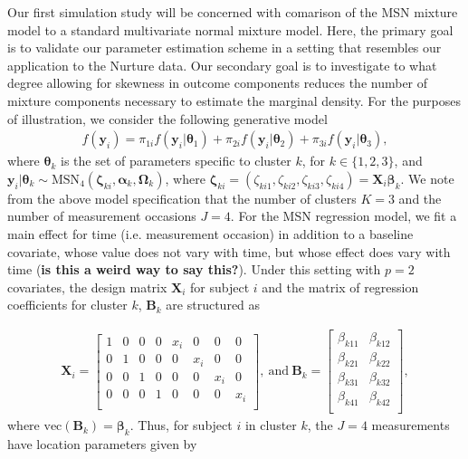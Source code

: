 \documentclass[useAMS,referee]{biom}
\begin{document}
Our first simulation study will be concerned with comarison of the MSN mixture model to a standard multivariate normal mixture model. Here, the primary goal is to validate our parameter estimation scheme in a setting that resembles our application to the Nurture data. Our secondary goal is to investigate to what degree allowing for skewness in outcome components reduces the number of mixture components necessary to estimate the marginal density. For the purposes of illustration, we consider the following generative model 
\begin{eqnarray}
	f(\mathbf{y}_i) = \pi_{1i}f(\mathbf{y}_i|\boldsymbol\theta_1) + \pi_{2i}f(\mathbf{y}_i|\boldsymbol\theta_2) + \pi_{3i}f(\mathbf{y}_i|\boldsymbol\theta_3), \nonumber
\end{eqnarray}
where $\boldsymbol\theta_k$ is the set of parameters specific to cluster $k$, for $k \in \{1,2,3 \}$, and $\mathbf{y}_i | \boldsymbol\theta_k \sim \text{MSN}_4(\boldsymbol\zeta_{ki},\boldsymbol\alpha_k,\boldsymbol\Omega_k)$, where $\boldsymbol\zeta_{ki} = (\zeta_{ki1},\zeta_{ki2},\zeta_{ki3},\zeta_{ki4}) = \mathbf{X}_i \boldsymbol\beta_{k}$. We note from the above model specification that the number of clusters $K = 3$ and the number of measurement occasions $J = 4$. For the MSN regression model, we fit a main effect for time (i.e. measurement occasion) in addition to a baseline covariate, whose value does not vary with time, but whose effect does vary with time (\textbf{is this a weird way to say this?}). Under this setting with $p = 2$ covariates, the design matrix $\mathbf{X}_i$ for subject $i$ and the matrix of regression coefficients for cluster $k$, $\mathbf{B}_k$ are structured as

\begin{eqnarray}
	\mathbf{X}_i = 
	\begin{bmatrix}
		1 & 0 & 0 & 0 & x_i & 0 & 0 & 0\\
		0 & 1 & 0 & 0 & 0 & x_i & 0 & 0\\
		0 & 0 & 1 & 0 & 0 & 0 & x_i & 0\\
		0 & 0 & 0 & 1 & 0 & 0 & 0 & x_i\\
	\end{bmatrix}, \ \text{and} \ 
	\mathbf{B}_k = 
	\begin{bmatrix}
		\beta_{k11} & \beta_{k12} \\
		\beta_{k21} & \beta_{k22} \\
		\beta_{k31} & \beta_{k32} \\
		\beta_{k41} & \beta_{k42} \\
	\end{bmatrix}, \nonumber
\end{eqnarray}
where $\text{vec}({\mathbf{B}_k}) = \boldsymbol\beta_k$. Thus, for subject $i$ in cluster $k$, the $J = 4$ measurements have location parameters given by
\end{document}
